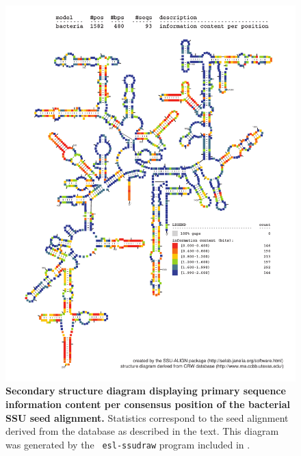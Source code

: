\begin{figure}
\begin{center}
\includegraphics[width=5.7in]{Figures/bacteria-0p1-info}
\end{center}
\caption[Secondary structure diagram displaying primary sequence
  information content per consensus position of the bacterial SSU seed
  alignment]{\textbf{Secondary structure diagram displaying primary
  sequence information content per consensus position of the bacterial SSU seed
  alignment.} Statistics correspond to the  seed
  alignment derived from the  database \cite{CannoneGutell02}
  as described in the text. This diagram was generated by the {\tt
  esl-ssudraw} program included in .}
\label{fig:bacinfo}
\end{figure}


